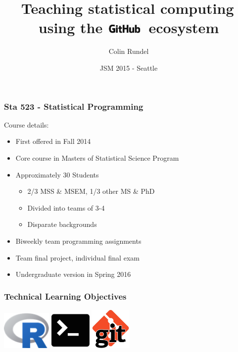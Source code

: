 \documentclass[12pt]{beamer}
\title{Teaching statistical computing$\,$ using the \includegraphics[width=0.7in]{imgs/github.png}$\,$ ecosystem}
\subtitle{}
\date{JSM 2015 - Seattle}
\author{Colin Rundel}
\institute{Duke University\\Department of Statistical Science}
\begin{document}
\maketitle


\begin{frame}[t]
\frametitle{Sta 523 - Statistical Programming}

Course details:
\begin{itemize}
\item First offered in Fall 2014
\item Core course in Masters of Statistical Science Program
\item Approximately 30 Students
\begin{itemize}
\item 2/3 MSS \& MSEM, 1/3 other MS \& PhD
\item Divided into teams of 3-4
\item Disparate backgrounds
\end{itemize}
\item Biweekly team programming assignments
\item Team final project, individual final exam
\item Undergraduate version in Spring 2016
\end{itemize}


\end{frame}


\begin{frame}
\frametitle{Technical Learning Objectives}

\hspace{0.1in}
\includegraphics[width=0.95in]{imgs/R.png}
\hfill
\includegraphics[width=0.8in]{imgs/term.png}
\hfill
\includegraphics[width=0.8in]{imgs/git.jpg}
\hspace{0.1in}

\end{frame}
\end{document}
